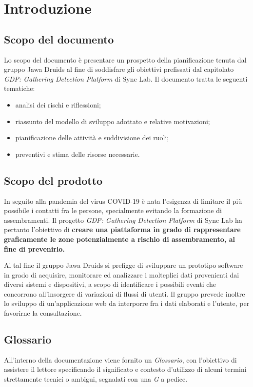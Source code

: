 \chapter{Introduzione}\label{Introduzione}

\section{Scopo del documento}\label{1.1}
Lo scopo del documento è presentare un prospetto della pianificazione tenuta dal gruppo Jawa Druids al fine di soddisfare gli obiettivi prefissati dal capitolato \textit{GDP: Gathering Detection Platform} di Sync Lab. Il documento tratta le seguenti tematiche:
\begin{itemize}
\item analisi dei rischi e riflessioni;
\item riassunto del modello di sviluppo adottato e relative motivazioni;
\item pianificazione delle attività e suddivisione dei ruoli;
\item preventivi e stima delle risorse necessarie.
\end{itemize}

\section{Scopo del prodotto}\label{1.2}
In seguito alla pandemia del virus COVID-19 è nata l'esigenza di limitare il più possibile i contatti fra le persone, specialmente evitando la formazione di assembramenti. Il progetto \textit{GDP: Gathering Detection Platform} di Sync Lab ha pertanto l'obiettivo di \textbf{creare una piattaforma in grado di rappresentare graficamente le zone potenzialmente a rischio di assembramento, al fine di prevenirlo.}

Al tal fine il gruppo Jawa Druids si prefigge di sviluppare un prototipo software in grado di acquisire, monitorare ed analizzare i molteplici dati provenienti dai diversi sistemi e dispositivi, a scopo di identificare i possibili eventi che concorrono all’insorgere di variazioni di flussi di utenti. Il gruppo prevede inoltre lo sviluppo di un'applicazione web da interporre fra i dati elaborati e l'utente, per favorirne la consultazione.

\section{Glossario}\label{1.3}

All'interno della documentazione viene fornito un \textit{Glossario}, con l'obiettivo di assistere il lettore specificando il significato e contesto d'utilizzo di alcuni termini strettamente tecnici o ambigui, segnalati con una \textit{G} a pedice.
